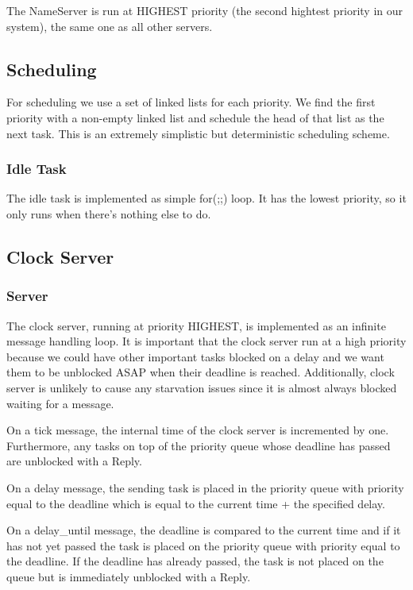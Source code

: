 \documentclass{article}
\begin{document}
The NameServer is run at HIGHEST priority (the second hightest priority in our system), the same one as all other servers. 

\subsection{Scheduling}

For scheduling we use a set of linked lists for each priority. We find the first priority with a non-empty linked list and schedule the head of that list as the next task. This is an extremely simplistic but deterministic scheduling scheme.

\subsubsection{Idle Task}

The idle task is implemented as simple for(;;) loop. It has the lowest priority, so it only runs when there's nothing else to do.

\subsection{Clock Server}

\subsubsection{Server}
The clock server, running at priority HIGHEST, is implemented as an infinite message handling loop. It is important that the clock server run at a high priority because we could have other important tasks blocked on a delay and we want them to be unblocked ASAP when their deadline is reached. Additionally, clock server is unlikely to cause any starvation issues since it is almost always blocked waiting for a message.

On a tick message, the internal time of the clock server is incremented by one. Furthermore, any tasks on top of the priority queue whose deadline has passed are unblocked with a Reply.

On a delay message, the sending task is placed in the priority queue with priority equal to the deadline which is equal to the current time + the specified delay.

On a delay\_until message, the deadline is compared to the current time and if it has not yet passed the task is placed on the priority queue with priority equal to the deadline. If the deadline has already passed, the task is not placed on the queue but is immediately unblocked with a Reply.
\end{document}
